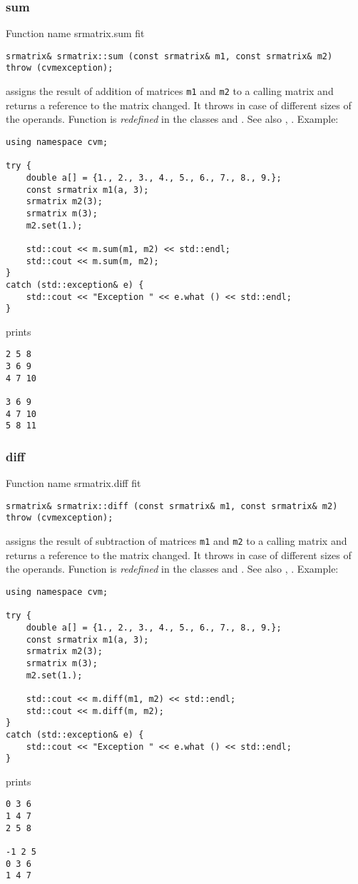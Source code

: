 \subsubsection{sum}
Function%
\pdfdest name {srmatrix.sum} fit
\begin{verbatim}
srmatrix& srmatrix::sum (const srmatrix& m1, const srmatrix& m2)
throw (cvmexception);
\end{verbatim}
assigns the result of addition of
matrices \verb"m1" and \verb"m2"  to a calling matrix
and returns a reference to
the matrix changed.
It throws  
in case of different sizes of the operands.
Function is \emph{redefined} in the classes
and .
See also ,
.
Example:
\begin{Verbatim}
using namespace cvm;

try {
    double a[] = {1., 2., 3., 4., 5., 6., 7., 8., 9.};
    const srmatrix m1(a, 3);
    srmatrix m2(3);
    srmatrix m(3);
    m2.set(1.);

    std::cout << m.sum(m1, m2) << std::endl;
    std::cout << m.sum(m, m2);
}
catch (std::exception& e) {
    std::cout << "Exception " << e.what () << std::endl;
}
\end{Verbatim}
prints
\begin{Verbatim}
2 5 8
3 6 9
4 7 10

3 6 9
4 7 10
5 8 11
\end{Verbatim}
\newpage



\subsubsection{diff}
Function%
\pdfdest name {srmatrix.diff} fit
\begin{verbatim}
srmatrix& srmatrix::diff (const srmatrix& m1, const srmatrix& m2)
throw (cvmexception);
\end{verbatim}
assigns the result of subtraction of
matrices \verb"m1" and \verb"m2" to a calling matrix
and returns a reference to
the matrix changed.
It throws  
in case of different sizes of the operands.
Function is \emph{redefined} in the classes
and .
See also ,
.
Example:
\begin{Verbatim}
using namespace cvm;

try {
    double a[] = {1., 2., 3., 4., 5., 6., 7., 8., 9.};
    const srmatrix m1(a, 3);
    srmatrix m2(3);
    srmatrix m(3);
    m2.set(1.);

    std::cout << m.diff(m1, m2) << std::endl;
    std::cout << m.diff(m, m2);
}
catch (std::exception& e) {
    std::cout << "Exception " << e.what () << std::endl;
}
\end{Verbatim}
prints
\begin{Verbatim}
0 3 6
1 4 7
2 5 8

-1 2 5
0 3 6
1 4 7
\end{Verbatim}
\newpage



